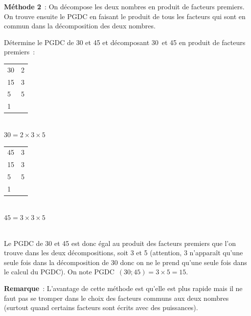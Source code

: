\newpage




\begin{methode*1}

\textcolor{H1}{\textbf{Méthode 2}} : On décompose les deux nombres en produit de facteurs premiers. On trouve ensuite le PGDC en faisant le produit de tous les facteurs qui sont en commun dans la décomposition des deux nombres.

\begin{exemple*1}
Détermine le PGDC de 30 et 45 et décomposant 30 et 45 en produit de facteurs premiers : \\[1em]
\begin{minipage}[t]{0.36\textwidth}
 \begin{tabularx}{0.4\textwidth}{X|X}
 30 & 2 \\ 
 15 & 3 \\
 5 & 5 \\
 1 & \\ 
 \end{tabularx} \\[1em]
$30 = 2 \times 3 \times 5$ 
\end{minipage} \hfill%
\begin{minipage}[t]{0.56\textwidth}
 \begin{tabularx}{0.3\textwidth}{X|X}
 45 & 3 \\ 
 15 & 3 \\
 5 & 5 \\
 1 & \\ 
 \end{tabularx} \\[1em]
$45 = 3 \times 3 \times 5$

 \end{minipage} \\

Le PGDC de 30 et 45 est donc égal au produit des facteurs premiers que l'on trouve dans les deux décompositions, soit 3 et 5 (attention, 3 n’apparaît qu'une seule fois dans la décomposition de 30 donc on ne le prend qu'une seule fois dans le calcul du PGDC).
On note PGDC $(30 ; 45) = 3 \times 5 = 15$. \\[-2em]
 \end{exemple*1}

 \vspace{1em}

\textcolor{H1}{\textbf{Remarque}} :
L'avantage de cette méthode est qu'elle est plus rapide mais il ne faut pas se tromper dans le choix des facteurs communs aux deux nombres (surtout quand certains facteurs sont écrits avec des puissances).



\end{methode*1}
